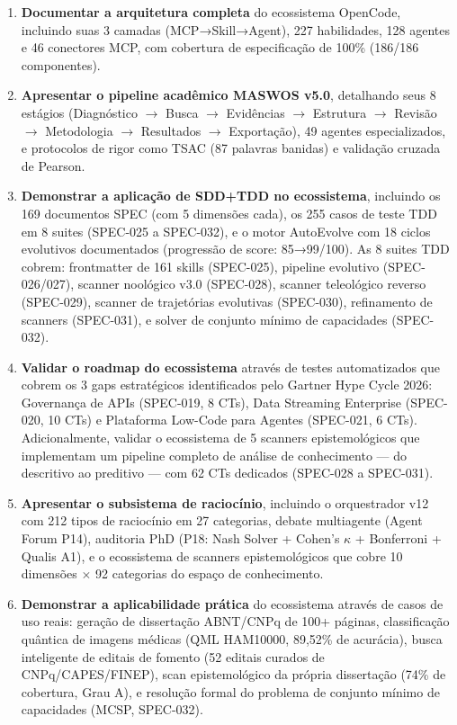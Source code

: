 \begin{enumerate}
  \item \textbf{Documentar a arquitetura completa} do ecossistema OpenCode, incluindo suas 3 camadas (MCP→Skill→Agent), 227 habilidades, 128 agentes e 46 conectores MCP, com cobertura de especificação de 100\% (186/186 componentes).

  \item \textbf{Apresentar o pipeline acadêmico MASWOS v5.0}, detalhando seus 8 estágios (Diagnóstico $\rightarrow$ Busca $\rightarrow$ Evidências $\rightarrow$ Estrutura $\rightarrow$ Revisão $\rightarrow$ Metodologia $\rightarrow$ Resultados $\rightarrow$ Exportação), 49 agentes especializados, e protocolos de rigor como TSAC (87 palavras banidas) e validação cruzada de Pearson.

  \item \textbf{Demonstrar a aplicação de SDD+TDD no ecossistema}, incluindo os 169 documentos SPEC (com 5 dimensões cada), os 255 casos de teste TDD em 8 suites (SPEC-025 a SPEC-032), e o motor AutoEvolve com 18 ciclos evolutivos documentados (progressão de score: 85→99/100). As 8 suites TDD cobrem: frontmatter de 161 skills (SPEC-025), pipeline evolutivo (SPEC-026/027), scanner noológico v3.0 (SPEC-028), scanner teleológico reverso (SPEC-029), scanner de trajetórias evolutivas (SPEC-030), refinamento de scanners (SPEC-031), e solver de conjunto mínimo de capacidades (SPEC-032).

  \item \textbf{Validar o roadmap do ecossistema} através de testes automatizados que cobrem os 3 gaps estratégicos identificados pelo Gartner Hype Cycle 2026: Governança de APIs (SPEC-019, 8 CTs), Data Streaming Enterprise (SPEC-020, 10 CTs) e Plataforma Low-Code para Agentes (SPEC-021, 6 CTs). Adicionalmente, validar o ecossistema de 5 scanners epistemológicos que implementam um pipeline completo de análise de conhecimento --- do descritivo ao preditivo --- com 62 CTs dedicados (SPEC-028 a SPEC-031).

  \item \textbf{Apresentar o subsistema de raciocínio}, incluindo o orquestrador v12 com 212 tipos de raciocínio em 27 categorias, debate multiagente (Agent Forum P14), auditoria PhD (P18: Nash Solver + Cohen's $\kappa$ + Bonferroni + Qualis A1), e o ecossistema de scanners epistemológicos que cobre 10 dimensões $\times$ 92 categorias do espaço de conhecimento.

  \item \textbf{Demonstrar a aplicabilidade prática} do ecossistema através de casos de uso reais: geração de dissertação ABNT/CNPq de 100+ páginas, classificação quântica de imagens médicas (QML HAM10000, 89,52\% de acurácia), busca inteligente de editais de fomento (52 editais curados de CNPq/CAPES/FINEP), scan epistemológico da própria dissertação (74\% de cobertura, Grau A), e resolução formal do problema de conjunto mínimo de capacidades (MCSP, SPEC-032).

\end{enumerate}

